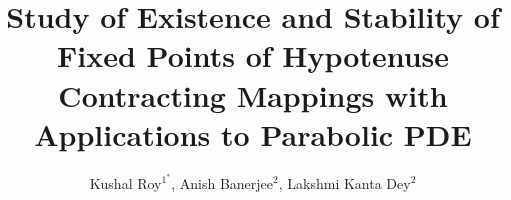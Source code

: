 \documentclass[11pt,reqno,a4paper]{amsart}
\theoremstyle{plain}
\theoremstyle{definition}
\theoremstyle{remark}
\numberwithin{equation}{section}
\begin{document}
\setcounter {page}{1}
\title[Study of Existence and Stability of Fixed Points]{Study of Existence and Stability of Fixed Points of Hypotenuse Contracting Mappings with Applications to Parabolic PDE}

\author[K.\ Roy, A.\ Banerjee, L.K.\ Dey]
{Kushal Roy$^{1^*}$, Anish Banerjee$^{2}$, Lakshmi Kanta Dey$^{2}$}
\newcommand{\acr}{\newline\indent}

\address{{$^{1}$}   Kushal Roy,
                    Department of Mathematics, 
                    Dr. B.C. Roy Engineering College, 
                    Jemua Road, Fuljhore, Durgapur – 713206,
                    West Bengal, India} 

\address{{$^{2}$}   Anish Banerjee,
                    Department of Mathematics,
                    National Institute of Technology
                    Durgapur, West Bengal, India}
\address{{$^{2}$}   Lakshmi Kanta Dey,
                    Department of Mathematics,
                    National Institute of Technology
                    Durgapur, West Bengal, India}

\end{document}
